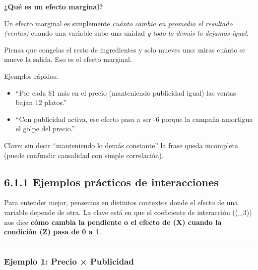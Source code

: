 \documentclass[
  spanish,
  letterpaper,
  DIV=11,
  numbers=noendperiod]{scrreprt}
\providecommand{\tightlist}{%
  \setlength{\itemsep}{0pt}\setlength{\parskip}{0pt}}
\begin{document}
\begin{tcolorbox}[enhanced jigsaw, toptitle=1mm, opacitybacktitle=0.6, leftrule=.75mm, arc=.35mm, title=\textcolor{quarto-callout-note-color}{\faInfo}\hspace{0.5em}{Nota}, colback=white, bottomrule=.15mm, colbacktitle=quarto-callout-note-color!10!white, opacityback=0, bottomtitle=1mm, breakable, rightrule=.15mm, coltitle=black, left=2mm, titlerule=0mm, colframe=quarto-callout-note-color-frame, toprule=.15mm]

\textbf{¿Qué es un efecto marginal?}

Un efecto marginal es simplemente \emph{cuánto cambia en promedio el
resultado (ventas)} cuando una variable sube una unidad \emph{y todo lo
demás lo dejamos igual}.

Piensa que congelas el resto de ingredientes y solo mueves uno: miras
cuánto se mueve la salida. Eso es el efecto marginal.

Ejemplos rápidos:

\begin{itemize}
\tightlist
\item
  ``Por cada \$1 más en el precio (manteniendo publicidad igual) las
  ventas bajan 12 platos.''
\item
  ``Con publicidad activa, ese efecto pasa a ser -6 porque la campaña
  amortigua el golpe del precio.''
\end{itemize}

Clave: sin decir ``manteniendo lo demás constante'' la frase queda
incompleta (puede confundir causalidad con simple correlación).

\end{tcolorbox}

\subsection{6.1.1 Ejemplos prácticos de
interacciones}\label{ejemplos-pruxe1cticos-de-interacciones}

Para entender mejor, pensemos en distintos contextos donde el efecto de
una variable depende de otra. La clave está en que el coeficiente de
interacción ((\beta\_3)) nos dice \textbf{cómo cambia la pendiente o el
efecto de (X) cuando la condición (Z) pasa de 0 a 1}.

\begin{center}\rule{0.5\linewidth}{0.5pt}\end{center}

\subsubsection{Ejemplo 1: Precio ×
Publicidad}\label{ejemplo-1-precio-publicidad}
\end{document}
